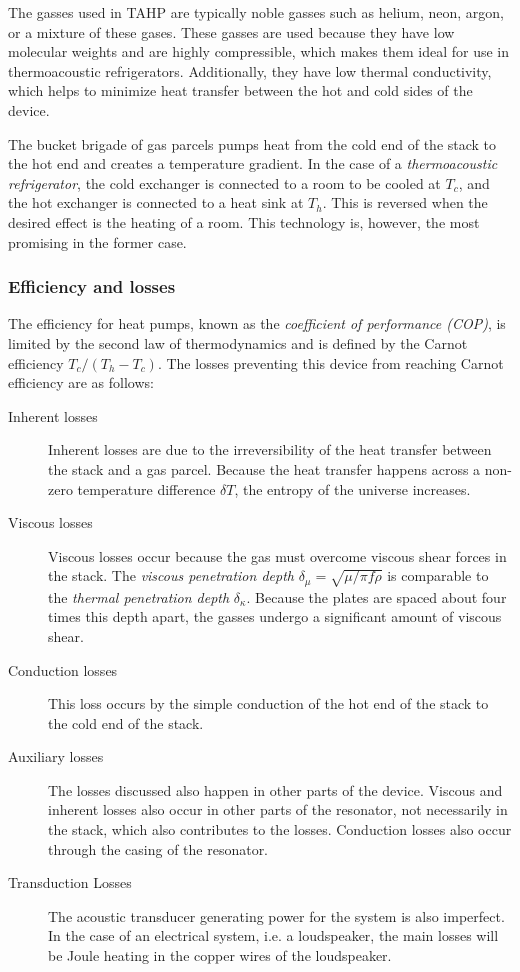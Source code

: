 \documentclass{article}
\begin{document}
The gasses used in TAHP are typically noble gasses such as helium, neon, argon, or a mixture of these gases. These gasses are used because they have low molecular weights and are highly compressible, which makes them ideal for use in thermoacoustic refrigerators. Additionally, they have low thermal conductivity, which helps to minimize heat transfer between the hot and cold sides of the device.

The bucket brigade of gas parcels pumps heat from the cold end of the stack to the hot end and creates a temperature gradient. In the case of a \emph{thermoacoustic refrigerator}, the cold exchanger is connected to a room to be cooled at \(T_c\), and the hot exchanger is connected to a heat sink at \(T_h\). This is reversed when the desired effect is the heating of a room. This technology is, however, the most promising in the former case.

\subsubsection{Efficiency and losses}
The efficiency for heat pumps, known as the \emph{coefficient of performance (COP)}, is limited by the second law of thermodynamics and is defined by the Carnot efficiency \(T_c/(T_h-T_c)\). The losses preventing this device from reaching Carnot efficiency are as follows:
\begin{description}
  \item[Inherent losses] Inherent losses are due to the irreversibility of the heat transfer between the stack and a gas parcel. Because the heat transfer happens across a non-zero temperature difference \(\delta T\), the entropy of the universe increases. %
  \item[Viscous losses] Viscous losses occur because the gas must overcome viscous shear forces in the stack. The \emph{viscous penetration depth} \(\delta_\mu=\sqrt{\mu / \pi f \rho} \) is comparable to the \emph{thermal penetration depth} \(\delta_\kappa\). Because the plates are spaced about four times this depth apart, the gasses undergo a significant amount of viscous shear.
  \item[Conduction losses] This loss occurs by the simple conduction of the hot end of the stack to the cold end of the stack.
  \item[Auxiliary losses] The losses discussed also happen in other parts of the device. Viscous and inherent losses also occur in other parts of the resonator, not necessarily in the stack, which also contributes to the losses. Conduction losses also occur through the casing of the resonator.
  \item[Transduction Losses] The acoustic transducer generating power for the system is also imperfect. In the case of an electrical system, i.e. a loudspeaker, the main losses will be Joule heating in the copper wires of the loudspeaker.
\end{description}
\end{document}
